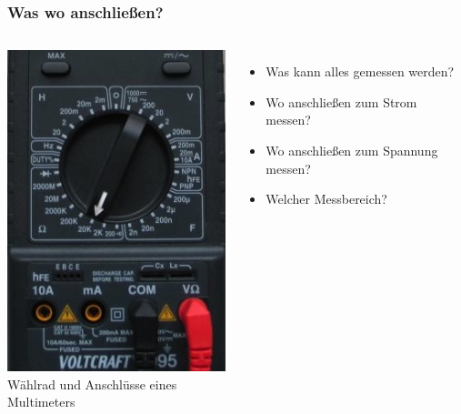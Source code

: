 \begin{frame}
  \frametitle{Was wo anschließen?}
  \begin{columns}
    \begin{center}
      \includegraphics[width=\textwidth,height=.8\textheight,keepaspectratio]{a16/digitalmultimeterMess.jpg}\\
      {\tiny Wählrad und Anschlüsse eines Multimeters \href{refs}{\cite{wmde}}}
    \end{center}
    \begin{itemize}
      \item Was kann alles gemessen werden?
      \item Wo anschließen zum Strom messen?
      \item Wo anschließen zum Spannung messen?
      \item Welcher Messbereich?
    \end{itemize}
  \end{columns}
\end{frame}


